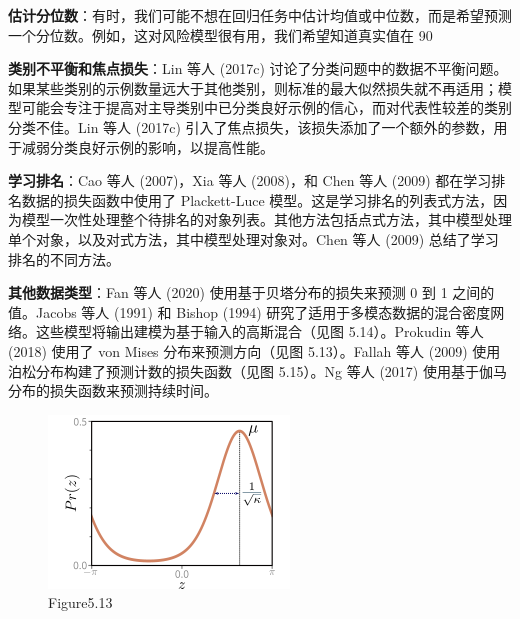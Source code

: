 \textbf{估计分位数}：有时，我们可能不想在回归任务中估计均值或中位数，而是希望预测一个分位数。例如，这对风险模型很有用，我们希望知道真实值在 90%

\textbf{类别不平衡和焦点损失}：Lin 等人 (2017c) 讨论了分类问题中的数据不平衡问题。如果某些类别的示例数量远大于其他类别，则标准的最大似然损失就不再适用；模型可能会专注于提高对主导类别中已分类良好示例的信心，而对代表性较差的类别分类不佳。Lin 等人 (2017c) 引入了焦点损失，该损失添加了一个额外的参数，用于减弱分类良好示例的影响，以提高性能。

\textbf{学习排名}：Cao 等人 (2007)，Xia 等人 (2008)，和 Chen 等人 (2009) 都在学习排名数据的损失函数中使用了 Plackett-Luce 模型。这是学习排名的列表式方法，因为模型一次性处理整个待排名的对象列表。其他方法包括点式方法，其中模型处理单个对象，以及对式方法，其中模型处理对象对。Chen 等人 (2009) 总结了学习排名的不同方法。

\textbf{其他数据类型}：Fan 等人 (2020) 使用基于贝塔分布的损失来预测 0 到 1 之间的值。Jacobs 等人 (1991) 和 Bishop (1994) 研究了适用于多模态数据的混合密度网络。这些模型将输出建模为基于输入的高斯混合（见图 5.14）。Prokudin 等人 (2018) 使用了 von Mises 分布来预测方向（见图 5.13）。Fallah 等人 (2009) 使用泊松分布构建了预测计数的损失函数（见图 5.15）。Ng 等人 (2017) 使用基于伽马分布的损失函数来预测持续时间。

\begin{figure}[ht!]
	\centering
	\includegraphics[width=0.7\linewidth]{png/chapter5/LossVonMises.png}
	\caption{Figure5.13}
\end{figure}

